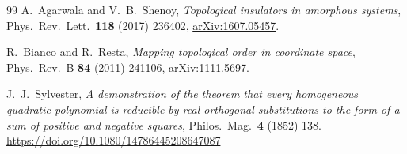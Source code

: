 \documentclass[11pt,a4paper]{article}
\theoremstyle{definition}
\begin{document}
\begin{thebibliography}{99}
A.~Agarwala and V.~B.~Shenoy,
\emph{Topological insulators in amorphous systems},
Phys.\ Rev.\ Lett.\ \textbf{118} (2017) 236402,
\href{https://arxiv.org/abs/1607.05457}{arXiv:1607.05457}.


R.~Bianco and R.~Resta,
\emph{Mapping topological order in coordinate space},
Phys.\ Rev.\ B \textbf{84} (2011) 241106,
\href{https://arxiv.org/abs/1111.5697}{arXiv:1111.5697}.

J.~J.~Sylvester,
\emph{A demonstration of the theorem that every homogeneous quadratic
polynomial is reducible by real orthogonal substitutions to the form of a
sum of positive and negative squares},
Philos.\ Mag.\ \textbf{4} (1852) 138.
\url{https://doi.org/10.1080/14786445208647087}

\end{thebibliography}
\end{document}
